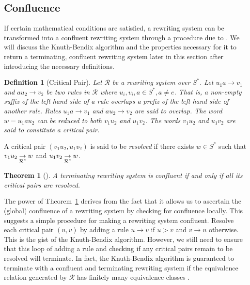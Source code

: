 \documentclass[utf8]{Frontiers_LaTex_Templates/frontiersFPHY} %
\newcommand{\id}{e}
\newcommand{\rws}{\mathcal{R}}
\newcommand{\writesto}{\rightarrow}
\newcommand{\writestoc}[1]{\underset{\mathclap{#1}}{\rightarrow}}
\numberwithin{equation}{section}
\newtheorem{definition}[prop]{Definition}
\newtheorem{theorem}[prop]{Theorem}
\begin{document}
\subsection{Confluence}
If certain mathematical conditions are satisfied, a rewriting system can be transformed into a confluent rewriting system through a procedure due to \citet{knuth1983simple}. We will discuss the Knuth-Bendix algorithm and the properties necessary for it to return a terminating, confluent rewriting system later in this section after introducing the necessary definitions.

\begin{definition}[Critical Pair]
Let $\rws$ be a rewriting system over $S^*$.
Let $u_1 a \writesto v_1$ and $a u_2 \writesto v_2$ be two rules in $\rws$ where $u_i, v_i, a \in S^*, a \neq \id$. That is, a non-empty suffix of the left hand side of a rule overlaps a prefix of the left hand side of another rule. Rules $u_1 a \writesto v_1$  and $a u_2 \writesto v_2$ are said to \emph{overlap}. The word $w = u_1au_2$ can be reduced to both $v_1u_2$ and $u_1 v_2$. The words $v_1u_2$ and $u_1 v_2$ are said to constitute a \emph{critical pair}.
\end{definition}

A critical pair $(v_1u_2, u_1 v_2)$ is said to be \emph{resolved} if there exists $w \in S^*$ such that $v_1u_2 \writestoc{\rws^*} w$ and $u_1 v_2 \writestoc{\rws^*} w$. 

\begin{theorem}[{\citep[Lemma 2.7.2]{baader1999term}}]
\label{thm:cpl}
A terminating rewriting system is confluent if and only if all its critical pairs are resolved.
\end{theorem}


The power of Theorem~\ref{thm:cpl} derives from the fact that it allows us to ascertain the (global) confluence of a rewriting system by checking for confluence locally. This suggests a simple procedure for making a rewriting system confluent. Resolve each critical pair $(u, v)$ by adding a rule $u \writesto v$ if $u > v$ and $v \writesto u$ otherwise. This is the gist of the Knuth-Bendix algorithm. However, we still need to ensure that this loop of adding a rule and checking if any critical pairs remain to be resolved will terminate. In fact, the Knuth-Bendix algorithm is guaranteed to terminate with a confluent and terminating rewriting system if the equivalence relation generated by $\rws$ has finitely many equivalence classes	 \citep[Corollary 12.21]{holt2005handbook}. 
\end{document}

